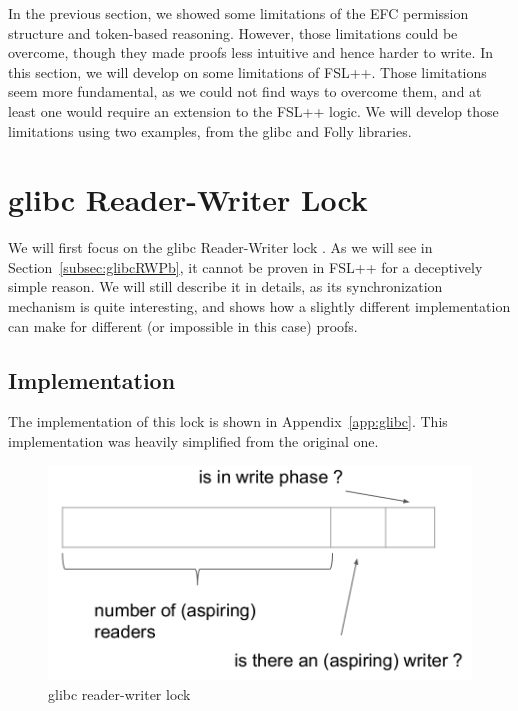In the previous section, we showed some limitations of the EFC permission structure and token-based reasoning. However, those limitations could be overcome, though they made proofs less intuitive and hence harder to write. In this section, we will develop on some limitations of FSL++. Those limitations seem more fundamental, as we could not find ways to overcome them, and at least one would require an extension to the FSL++ logic. We will develop those limitations using two examples, from the glibc and Folly libraries.

\section{glibc Reader-Writer Lock}
We will first focus on the glibc Reader-Writer lock \cite{glibcRW}. As we will see in Section~\ref{subsec:glibcRWPb}, it cannot be proven in FSL++ for a deceptively simple reason. We will still describe it in details, as its synchronization mechanism is quite interesting, and shows how a slightly different implementation can make for different (or impossible in this case) proofs.

\subsection{Implementation}
The implementation of this lock is shown in Appendix~\ref{app:glibc}. This implementation was heavily simplified from the original one.%

\begin{figure}
		\begin{center}
		\includegraphics[width=\linewidth]{schemaglibc.png}
		\end{center}
		\caption{glibc reader-writer lock}
		\label{schemaglibc}
\end{figure}

